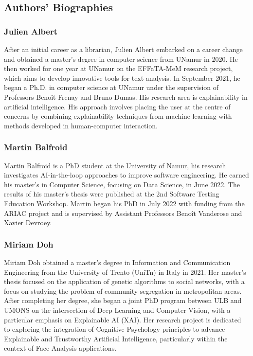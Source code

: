 \subsection{Authors' Biographies}


\subsubsection{Julien Albert}

After an initial career as a librarian, Julien Albert embarked on a career change and obtained a master's degree in computer science from UNamur in 2020. He then worked for one year at UNamur on the EFFaTA-MeM research project, which aims to develop innovative tools for text analysis. In September 2021, he began a Ph.D. in computer science at UNamur under the supervision of Professors Benoît Frenay and Bruno Dumas. His research area is explainability in artificial intelligence. His approach involves placing the user at the centre of concerns by combining explainability techniques from machine learning with methods developed in human-computer interaction.

\subsubsection{Martin Balfroid}

Martin Balfroid is a PhD student at the University of Namur, his research investigates AI-in-the-loop approaches to improve software engineering. He earned his master's in Computer Science, focusing on Data Science, in June 2022. The results of his master's thesis were published at the 2nd Software Testing Education Workshop. Martin began his PhD in July 2022 with funding from the ARIAC project and is supervised by Assistant Professors Benoît Vanderose and Xavier Devroey. 

\subsubsection{Miriam Doh}

Miriam Doh obtained a master's degree in Information and Communication Engineering from the University of Trento (UniTn) in Italy in 2021. Her master's thesis focused on the application of genetic algorithms to social networks, with a focus on studying the problem of community segregation in metropolitan areas. After completing her degree, she began a joint PhD program between ULB and UMONS on the intersection of Deep Learning and Computer Vision, with a particular emphasis on Explainable AI (XAI). Her research project is dedicated to exploring the integration of Cognitive Psychology principles to advance Explainable and Trustworthy Artificial Intelligence, particularly within the context of Face Analysis applications.

